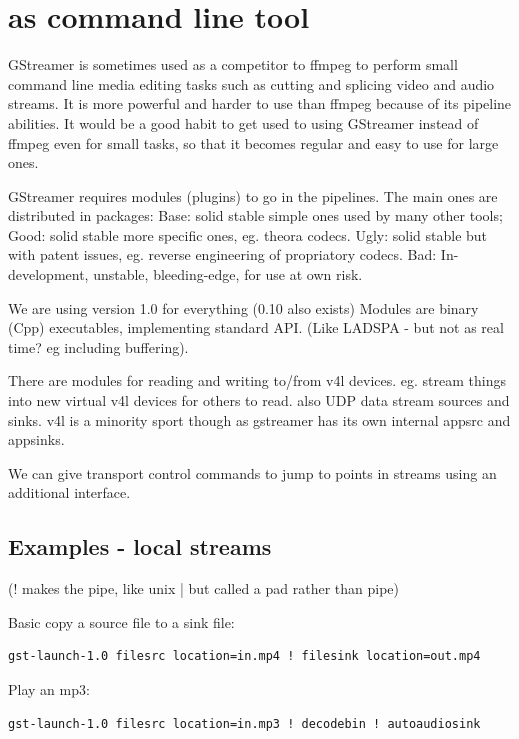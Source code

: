 \documentclass[oneside,english]{scrbook}
\begin{document}
\section{as command line tool}

GStreamer is sometimes used as a competitor to ffmpeg to perform small command line media editing tasks such as cutting and splicing video and audio streams. It is more powerful and harder to use than ffmpeg because of its pipeline abilities.  It would be a good habit to get used to using GStreamer instead of ffmpeg even for small tasks, so that it becomes regular and easy to use for large ones.

GStreamer requires modules (plugins) to go in the pipelines. The main ones are distributed in packages:
 Base: solid stable simple ones used by many other tools;
 Good: solid stable more specific ones, eg. theora codecs.
 Ugly: solid stable but with patent issues, eg. reverse engineering of propriatory codecs.
 Bad: In-development, unstable, bleeding-edge, for use at own risk.

We are using version 1.0 for everything (0.10 also exists) Modules
are binary (Cpp) executables, implementing standard API. (Like LADSPA
- but not as real time? eg including buffering).

There are modules for reading and writing to/from v4l devices. eg. stream things
into new virtual v4l devices for others to read. also UDP data stream
sources and sinks. v4l is a minority sport though as gstreamer has
its own internal appsrc and appsinks.

We can give transport control commands to jump to points in streams using an additional interface.

\subsection{Examples - local streams}

(\textquotedbl{}!\textquotedbl{} makes the pipe, like unix \textquotedbl{}|\textquotedbl{}
but called a \textquotedbl{}pad\textquotedbl{} rather than \textquotedbl{}pipe\textquotedbl{})

Basic copy a source file to a sink file: 

\begin{lstlisting}
gst-launch-1.0 filesrc location=in.mp4 ! filesink location=out.mp4
\end{lstlisting}

Play an mp3:

\begin{lstlisting}
gst-launch-1.0 filesrc location=in.mp3 ! decodebin ! autoaudiosink
\end{lstlisting}
\end{document}
